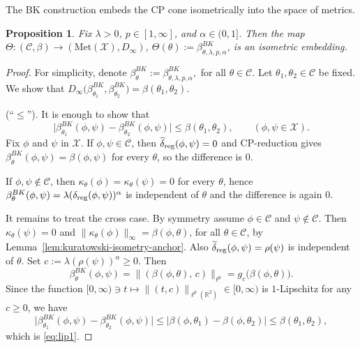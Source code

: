 \documentclass[11pt]{amsart}
\newtheorem{proposition}[theorem]{Proposition}
\theoremstyle{definition}
\theoremstyle{remark}
\newcommand{\1}{\mathbbm{1}}
\begin{document}
The BK construction embeds the CP cone isometrically into the space of metrics.

\begin{proposition}\label{prop:isometric-anchor-map} Fix $\lambda>0$, $p\in[1,\infty]$, and $\alpha\in(0,1]$. Then the map $\Theta:(\mathcal C,\beta)\to(\mathrm{Met}(\mathcal X),D_\infty)$, $\Theta(\theta):=\beta^{BK}_{\theta,\lambda,p,\alpha}$, is an isometric embedding.
\end{proposition}

\begin{proof} For simplicity, denote $\beta^{BK}_\theta:=\beta^{BK}_{\theta,\lambda,p,\alpha},$ for all $\theta\in\mathcal C$. Let $\theta_1,\theta_2\in \mathcal C$ be fixed. We show that
$D_\infty\bigl(\beta^{BK}_{\theta_1},\beta^{BK}_{\theta_2}\bigr)=\beta(\theta_1,\theta_2)$.

(``$\le$'').
It is enough to show that
\begin{equation}\label{eq:lip1}
\bigl|\beta^{BK}_{\theta_1}(\phi,\psi)-\beta^{BK}_{\theta_2}(\phi,\psi)\bigr|
\le \beta(\theta_1,\theta_2),
\qquad (\phi,\psi\in \mathcal X).
\end{equation}
Fix  $\phi$ and $\psi$ in $\mathcal X$.
If $\phi,\psi\in \mathcal C$, then $\widetilde\delta_{\rm reg}(\phi,\psi)=0$ and CP-reduction gives
$\beta^{BK}_{\theta}(\phi,\psi)=\beta(\phi,\psi)$ for every $\theta$, so the difference is $0$.

If $\phi,\psi\notin \mathcal C$, then $\kappa_{\theta}(\phi)=\kappa_{\theta}(\psi)=0$ for every $\theta$, hence
$\beta^{BK}_{\theta}(\phi,\psi)=\lambda(\delta_{\rm reg}(\phi,\psi))^\alpha$ is independent of $\theta$ and the difference is again $0$.

It remains to treat the cross case. By symmetry assume $\phi\in \mathcal C$ and $\psi\notin \mathcal C$.
Then $\kappa_{\theta}(\psi)=0$ and $\|\kappa_\theta(\phi)\|_\infty=\beta(\phi,\theta)$, for all $\theta\in \mathcal C$, by Lemma~\ref{lem:kuratowski-isometry-anchor}.
Also $\widetilde\delta_{\rm reg}(\phi,\psi)=\rho(\psi)$ is independent of $\theta$.
Set $c:=\lambda(\rho(\psi))^\alpha\ge 0$. Then
\[
\beta^{BK}_{\theta}(\phi,\psi)=\|( \beta(\phi,\theta),\,c)\|_{\ell^p}=g_c\bigl(\beta(\phi,\theta)\bigr).
\]
Since the function $[0,\infty)\ni t\mapsto \|(t,c)\|_{\ell^p(\mathbb R^2)} \in[0,\infty)$
is $1$-Lipschitz for any $c\ge 0$, we have
\[
\bigl|\beta^{BK}_{\theta_1}(\phi,\psi)-\beta^{BK}_{\theta_2}(\phi,\psi)\bigr|
\le \bigl|\beta(\phi,\theta_1)-\beta(\phi,\theta_2)\bigr|
\le \beta(\theta_1,\theta_2),
\]
which is \eqref{eq:lip1}.


\end{proof}
\end{document}
